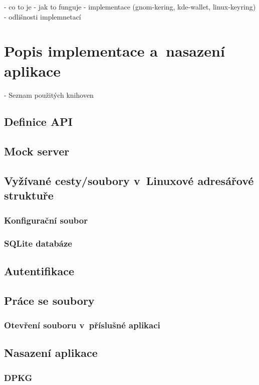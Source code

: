- co to je
- jak to funguje
- implementace (gnom-kering, kde-wallet, linux-keyring)
    - odlišnosti implemnetací

\cite{Keyring}

\chapter{Popis implementace a nasazení aplikace}

- Seznam použitých knihoven

\section{Definice API}
\section{Mock server}
\section{Vyžívané cesty/soubory v Linuxové adresářové struktuře}
\subsection{Konfigurační soubor}
\subsection{SQLite databáze}
\section{Autentifikace}
\section{Práce se soubory}
\subsection{Otevření souboru v příslušné aplikaci}

\cite{xdg}

\section{Nasazení aplikace}
\subsection{DPKG} %
